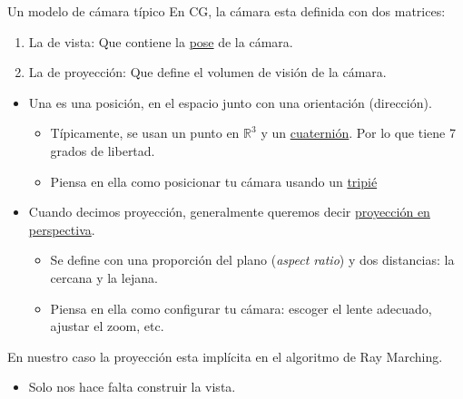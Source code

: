 \begin{frame}{Un modelo de cámara típico}
En CG, la cámara esta definida con dos matrices:
\begin{enumerate}
  \item La de \alert{vista}: Que contiene la \href{https://en.wikipedia.org/wiki/Pose_(computer_vision)}{pose} de la cámara.
  \item La de \alert{proyección}: Que define el volumen de visión de la cámara.
\end{enumerate}
\begin{itemize}
   \item Una  es una posición, en el espacio junto con una orientación (dirección).
   \begin{itemize}
     \item Típicamente, se usan un punto en $\mathbb{R}^3$ y un \href{https://en.wikipedia.org/wiki/Quaternion}{cuaternión}. Por lo que tiene 7 grados de libertad.
     \item Piensa en ella como posicionar tu cámara usando un \href{https://en.wikipedia.org/wiki/Tripod_(photography)}{tripié}
   \end{itemize}
   \item Cuando decimos proyección, generalmente queremos decir \href{https://en.wikipedia.org/wiki/3D_projection\#Perspective_projection}{proyección en perspectiva}.
   \begin{itemize}
     \item Se define con una proporción del plano (\emph{aspect ratio}) y dos distancias: la cercana y la lejana.
     \item Piensa en ella como configurar tu cámara: escoger el lente adecuado, ajustar el zoom, etc.
   \end{itemize}
\end{itemize}
\begin{block}{}
 En nuestro caso la proyección esta implícita en el algoritmo de Ray Marching.
 \begin{itemize}
   \item Solo nos hace falta construir la vista.
 \end{itemize}
\end{block}
\end{frame}

